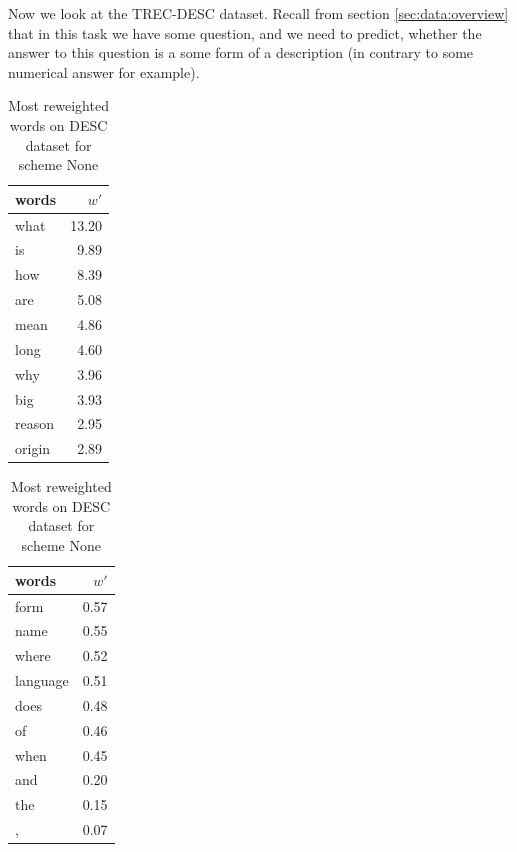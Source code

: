     Now we look at the TREC-DESC dataset. 
    Recall from section \ref{sec:data:overview} that in this task we have some question, and we need to predict, whether the answer to this question is a some form of a description (in contrary to some numerical answer for example).
    
    
    

\begin{table}[H]
    \centering
    \begin{minipage}{.4\linewidth}
      \centering
        \begin{tabular}{lr}
\toprule
  words &   $w'$ \\
\midrule
   what &  13.20 \\
     is &   9.89 \\
    how &   8.39 \\
    are &   5.08 \\
   mean &   4.86 \\
   long &   4.60 \\
    why &   3.96 \\
    big &   3.93 \\
 reason &   2.95 \\
 origin &   2.89 \\
\bottomrule
\end{tabular}

    \end{minipage}
    \begin{minipage}{.4\linewidth}
      \centering
        \begin{tabular}{lr}
\toprule
    words &  $w'$ \\
\midrule
     form &  0.57 \\
     name &  0.55 \\
    where &  0.52 \\
 language &  0.51 \\
     does &  0.48 \\
       of &  0.46 \\
     when &  0.45 \\
      and &  0.20 \\
      the &  0.15 \\
        , &  0.07 \\
\bottomrule
\end{tabular}

    \end{minipage} 
    \caption{Most reweighted words on DESC dataset for scheme None}
    \label{tab:words:TREC:none}
\end{table}

